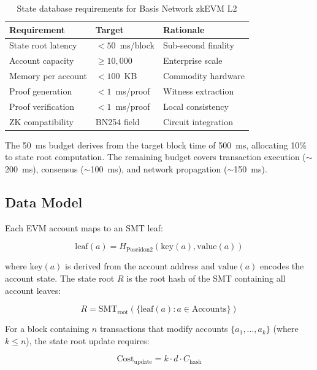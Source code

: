 \begin{table}[h]
\centering
\caption{State database requirements for Basis Network zkEVM L2}
\label{tab:requirements}
\begin{tabular}{lll}
\toprule
\textbf{Requirement} & \textbf{Target} & \textbf{Rationale} \\
\midrule
State root latency & $< 50$~ms/block & Sub-second finality \\
Account capacity & $\geq 10{,}000$ & Enterprise scale \\
Memory per account & $< 100$~KB & Commodity hardware \\
Proof generation & $< 1$~ms/proof & Witness extraction \\
Proof verification & $< 1$~ms/proof & Local consistency \\
ZK compatibility & BN254 field & Circuit integration \\
\bottomrule
\end{tabular}
\end{table}

The 50~ms budget derives from the target block time of 500~ms,
allocating 10\% to state root computation. The remaining budget
covers transaction execution ($\sim$200~ms), consensus
($\sim$100~ms), and network propagation ($\sim$150~ms).

\subsection{Data Model}

Each EVM account maps to an SMT leaf:

\begin{equation}
\text{leaf}(a) = H_{\text{Poseidon2}}(\text{key}(a), \text{value}(a))
\label{eq:leaf}
\end{equation}

where $\text{key}(a)$ is derived from the account address and
$\text{value}(a)$ encodes the account state. The state root
$R$ is the root hash of the SMT containing all account leaves:

\begin{equation}
R = \text{SMT}_{\text{root}}(\{\text{leaf}(a) : a \in \text{Accounts}\})
\label{eq:root}
\end{equation}

For a block containing $n$ transactions that modify accounts
$\{a_1, \ldots, a_k\}$ (where $k \leq n$), the state root update
requires:

\begin{equation}
\text{Cost}_{\text{update}} = k \cdot d \cdot C_{\text{hash}}
\label{eq:cost}
\end{equation}

